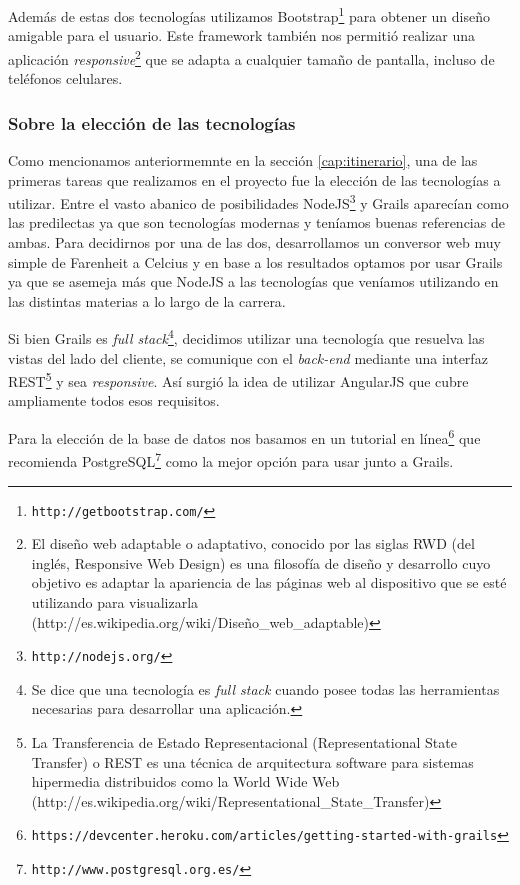 Además de estas dos tecnologías utilizamos Bootstrap\footnote{\texttt{http://getbootstrap.com/}} para obtener un diseño amigable para el usuario. Este framework también nos permitió realizar una aplicación \textit{responsive}\footnote{El diseño web adaptable o adaptativo, conocido por las siglas RWD (del inglés, Responsive Web Design) es una filosofía de diseño y desarrollo cuyo objetivo es adaptar la apariencia de las páginas web al dispositivo que se esté utilizando para visualizarla (http://es.wikipedia.org/wiki/Diseño\_web\_adaptable)} que se adapta a cualquier tamaño de pantalla, incluso de teléfonos celulares.

\subsubsection{Sobre la elección de las tecnologías}\label{cap:eleccion_tecnologias}
Como mencionamos anteriormemnte en la sección \ref{cap:itinerario}, una de las primeras tareas que realizamos en el proyecto fue la elección de las tecnologías a utilizar. Entre el vasto abanico de posibilidades NodeJS\footnote{\texttt{http://nodejs.org/}} y Grails aparecían como las predilectas ya que son tecnologías modernas y teníamos buenas referencias de ambas. Para decidirnos por una de las dos, desarrollamos un conversor web muy simple de Farenheit a Celcius y en base a los resultados optamos por usar Grails ya que se asemeja más que NodeJS a las tecnologías que veníamos utilizando en las distintas materias a lo largo de la carrera.

Si bien Grails es \textit{full stack}\footnote{Se dice que una tecnología es \textit{full stack} cuando posee todas las herramientas necesarias para desarrollar una aplicación.}, decidimos utilizar una tecnología que resuelva las vistas del lado del cliente, se comunique con el \textit{back-end} mediante una interfaz REST\footnote{La Transferencia de Estado Representacional (Representational State Transfer) o REST es una técnica de arquitectura software para sistemas hipermedia distribuidos como la World Wide Web (http://es.wikipedia.org/wiki/Representational\_State\_Transfer)} 
y sea \textit{responsive}. Así surgió la idea de utilizar AngularJS que cubre ampliamente todos esos requisitos.

Para la elección de la base de datos nos basamos en un tutorial en línea\footnote{\texttt{https://devcenter.heroku.com/articles/getting-started-with-grails}} que recomienda PostgreSQL\footnote{\texttt{http://www.postgresql.org.es/}} como la mejor opción para usar junto a Grails.

